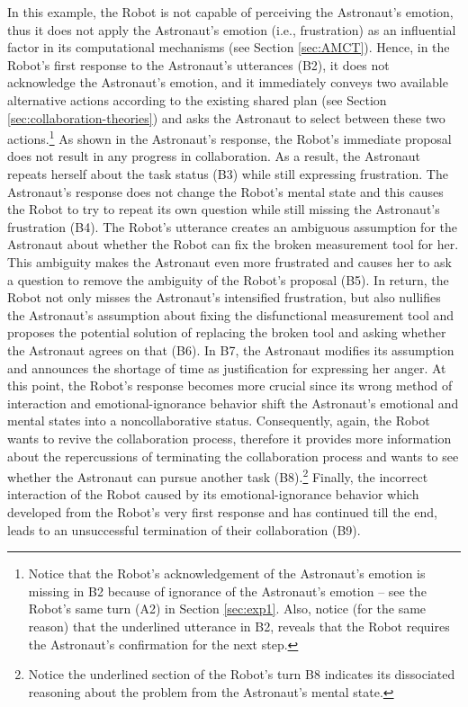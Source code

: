 In this example, the Robot is not capable of perceiving the Astronaut's emotion,
thus it does not apply the Astronaut's emotion (i.e., frustration) as an
influential factor in its computational mechanisms (see Section \ref{sec:AMCT}).
Hence, in the Robot's first response to the Astronaut's utterances (B2), it does
not acknowledge the Astronaut's emotion, and it immediately conveys two
available alternative actions according to the existing shared plan (see Section
\ref{sec:collaboration-theories}) and asks the Astronaut to select between these
two actions.\footnote{Notice that the Robot's acknowledgement of the Astronaut's
emotion is missing in B2 because of ignorance of the Astronaut's emotion -- see
the Robot's same turn (A2) in Section \ref{sec:exp1}. Also, notice (for the same
reason) that the underlined utterance in B2, reveals that the Robot requires the
Astronaut's confirmation for the next step.} As shown in the Astronaut's
response, the Robot's immediate proposal does not result in any progress in
collaboration. As a result, the Astronaut repeats herself about the task status
(B3) while still expressing frustration. The Astronaut's response does not
change the Robot's mental state and this causes the Robot to try to repeat its
own question while still missing the Astronaut's frustration (B4). The Robot's
utterance creates an ambiguous assumption for the Astronaut about whether the
Robot can fix the broken measurement tool for her. This ambiguity makes the
Astronaut even more frustrated and causes her to ask a question to remove the
ambiguity of the Robot's proposal (B5). In return, the Robot not only misses the
Astronaut's intensified frustration, but also nullifies the Astronaut's
assumption about fixing the disfunctional measurement tool and proposes the
potential solution of replacing the broken tool and asking whether the Astronaut
agrees on that (B6). In B7, the Astronaut modifies its assumption and announces
the shortage of time as justification for expressing her anger. At this point,
the Robot's response becomes more crucial since its wrong method of interaction
and emotional-ignorance behavior shift the Astronaut's emotional and mental
states into a noncollaborative status. Consequently, again, the Robot wants to revive
the collaboration process, therefore it provides more information about the
repercussions of terminating the collaboration process and wants to see whether
the Astronaut can pursue another task (B8).\footnote{Notice the underlined
section of the Robot's turn B8 indicates its dissociated reasoning about the
problem from the Astronaut's mental state.} Finally, the incorrect interaction
of the Robot caused by its emotional-ignorance behavior which developed from the
Robot's very first response and has continued till the end, leads to an
unsuccessful termination of their collaboration (B9).\\


